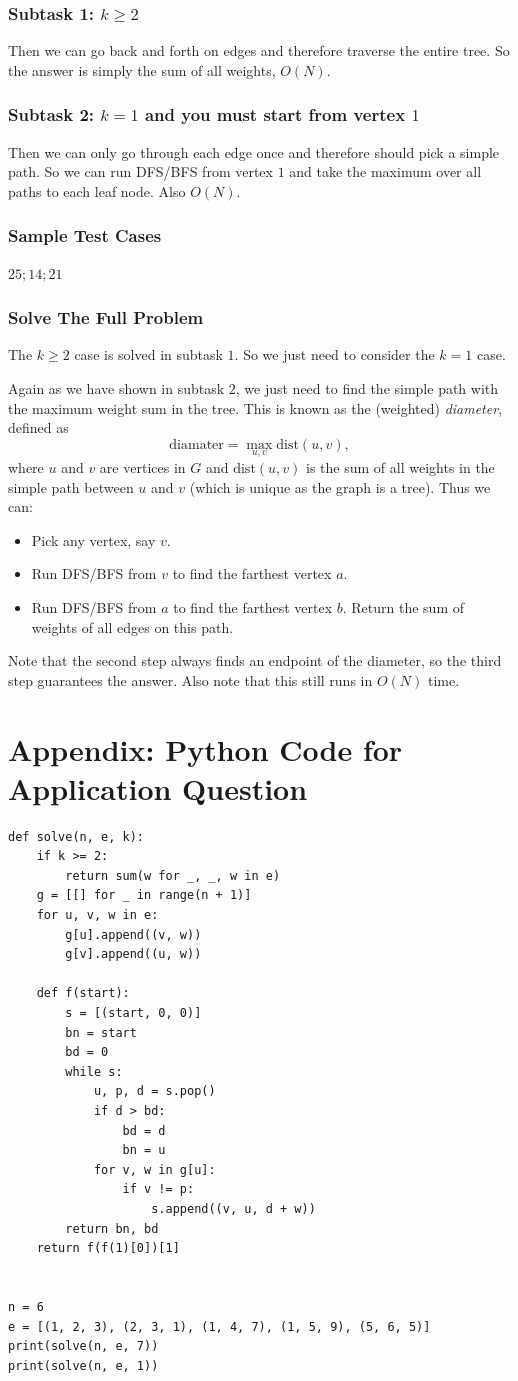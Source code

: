 \documentclass[12pt]{article}
\begin{document}
\subsubsection{Subtask 1: $k\ge2$}
Then we can go back and forth on edges and therefore traverse the entire tree. So the answer is simply the sum of all weights, $O(N)$.
\subsubsection{Subtask 2: $k=1$ and you must start from vertex $1$}
Then we can only go through each edge once and therefore should pick a simple path. So we can run DFS/BFS from vertex $1$ and take the maximum over all paths to each leaf node. Also $O(N)$.
\subsubsection{Sample Test Cases}
$25;14;21$
\subsubsection{Solve The Full Problem}
The $k\ge2$ case is solved in subtask $1$. So we just need to consider the $k=1$ case.

Again as we have shown in subtask $2$, we just need to find the simple path with the maximum weight sum in the tree. This is known as the (weighted) \textit{diameter}, defined as $$\mathrm{diamater}=\max_{u,v}\mathrm{dist}(u,v),$$ where $u$ and $v$ are vertices in $G$ and $\mathrm{dist}(u,v)$ is the sum of all weights in the simple path between $u$ and $v$ (which is unique as the graph is a tree). Thus we can:
\begin{itemize}
\item Pick any vertex, say $v$.
\item Run DFS/BFS from $v$ to find the farthest vertex $a$.
\item Run DFS/BFS from $a$ to find the farthest vertex $b$. Return the sum of weights of all edges on this path.
\end{itemize}
Note that the second step always finds an endpoint of the diameter, so the third step guarantees the answer. Also note that this still runs in $O(N)$ time.
\newpage
\section*{Appendix: Python Code for Application Question}
\begin{verbatim}
def solve(n, e, k):
    if k >= 2:
        return sum(w for _, _, w in e)
    g = [[] for _ in range(n + 1)]
    for u, v, w in e:
        g[u].append((v, w))
        g[v].append((u, w))

    def f(start):
        s = [(start, 0, 0)]
        bn = start
        bd = 0
        while s:
            u, p, d = s.pop()
            if d > bd:
                bd = d
                bn = u
            for v, w in g[u]:
                if v != p:
                    s.append((v, u, d + w))
        return bn, bd
    return f(f(1)[0])[1]


n = 6
e = [(1, 2, 3), (2, 3, 1), (1, 4, 7), (1, 5, 9), (5, 6, 5)]
print(solve(n, e, 7))
print(solve(n, e, 1))
\end{verbatim}
\end{document}
